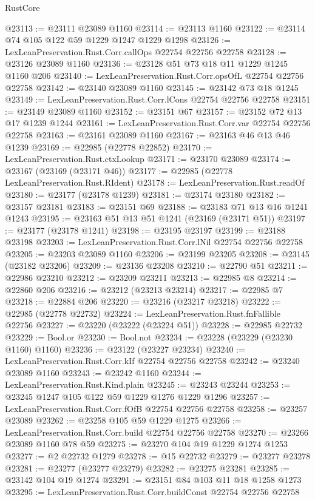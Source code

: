 \begin{lexlean}{RustCore}
\begin{coremodule}
@23113 := @23111 @23089 @1160
@23114 := @23113 @1160
@23122 := @23114 @74 @105 @122 @59 @1229 @1247 @1229 @1298
@23126 := LexLeanPreservation.Rust.Corr.callOps @22754 @22756 @22758
@23128 := @23126 @23089 @1160
@23136 := @23128 @51 @73 @18 @11 @1229 @1245 @1160 @206
@23140 := LexLeanPreservation.Rust.Corr.opsOfL @22754 @22756 @22758
@23142 := @23140 @23089 @1160
@23145 := @23142 @73 @18 @1245
@23149 := LexLeanPreservation.Rust.Corr.lCons @22754 @22756 @22758
@23151 := @23149 @23089 @1160
@23152 := @23151 @67
@23157 := @23152 @72 @13 @17 @1239 @1244
@23161 := LexLeanPreservation.Rust.Corr.var @22754 @22756 @22758
@23163 := @23161 @23089 @1160
@23167 := @23163 @46 @13 @46 @1239
@23169 := @22985 (@22778 @22852)
@23170 := LexLeanPreservation.Rust.ctxLookup
@23171 := @23170 @23089
@23174 := @23167 (@23169 (@23171 @46))
@23177 := @22985 (@22778 LexLeanPreservation.Rust.RIdent)
@23178 := LexLeanPreservation.Rust.readOf
@23180 := @23177 (@23178 @1239)
@23181 := @23174 @23180
@23182 := @23157 @23181
@23183 := @23151 @69
@23188 := @23183 @71 @13 @16 @1241 @1243
@23195 := @23163 @51 @13 @51 @1241 (@23169 (@23171 @51))
@23197 := @23177 (@23178 @1241)
@23198 := @23195 @23197
@23199 := @23188 @23198
@23203 := LexLeanPreservation.Rust.Corr.lNil @22754 @22756 @22758
@23205 := @23203 @23089 @1160
@23206 := @23199 @23205
@23208 := @23145 (@23182 @23206)
@23209 := @23136 @23208
@23210 := @22790 @51
@23211 := @22986 @23210
@23212 := @23209 @23211
@23213 := @22985 @8
@23214 := @22860 @206
@23216 := @23212 (@23213 @23214)
@23217 := @22985 @7
@23218 := @22884 @206
@23220 := @23216 (@23217 @23218)
@23222 := @22985 (@22778 @22732)
@23224 := LexLeanPreservation.Rust.fnFallible @22756
@23227 := @23220 (@23222 (@23224 @51))
@23228 := @22985 @22732
@23229 := Bool.or
@23230 := Bool.not
@23234 := @23228 (@23229 (@23230 @1160) @1160)
@23236 := @23122 (@23227 @23234)
@23240 := LexLeanPreservation.Rust.Corr.kIf @22754 @22756 @22758
@23242 := @23240 @23089 @1160
@23243 := @23242 @1160
@23244 := LexLeanPreservation.Rust.Kind.plain
@23245 := @23243 @23244
@23253 := @23245 @1247 @105 @122 @59 @1229 @1276 @1229 @1296
@23257 := LexLeanPreservation.Rust.Corr.fOfB @22754 @22756 @22758
@23258 := @23257 @23089
@23262 := @23258 @105 @59 @1229 @1275
@23266 := LexLeanPreservation.Rust.Corr.build @22754 @22756 @22758
@23270 := @23266 @23089 @1160 @78 @59
@23275 := @23270 @104 @19 @1229 @1274 @1253
@23277 := @2 @22732 @1279
@23278 := @15 @22732
@23279 := @23277 @23278
@23281 := @23277 (@23277 @23279)
@23282 := @23275 @23281
@23285 := @23142 @104 @19 @1274
@23291 := @23151 @84 @103 @11 @18 @1258 @1273
@23295 := LexLeanPreservation.Rust.Corr.buildConst @22754 @22756 @22758

\end{coremodule}
\end{lexlean}
